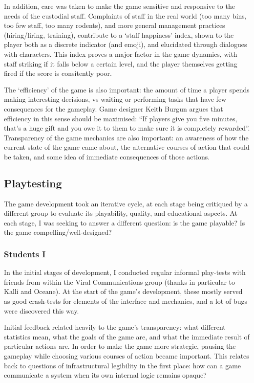 \documentclass[nofonts,nols,justified,nobib]{tufte-book}
\begin{document}
In addition, care was taken to make the game sensitive and responsive to the needs of the custodial staff. Complaints of staff in the real world (too many bins, too few staff, too many rodents), and more general management practices (hiring/firing, training), contribute to a `staff happiness' index, shown to the player both as a discrete indicator (and emoji), and elucidated through dialogues with characters. This index proves a major factor in the game dynamics, with staff striking if it falls below a certain level, and the player themselves getting fired if the score is consitently poor.

The `efficiency' of the game is also important: the amount of time a player spends making interesting decisions, vs waiting or performing tasks that have few consequences for the gameplay. Game designer Keith Burgun argues that efficiency in this sense should be maximised: ``If players give you five minutes, that's a huge gift and you owe it to them to make sure it is completely rewarded''. Transparency of the game mechanics are also important: an awareness of how the current state of the game came about, the alternative courses of action that could be taken, and some idea of immediate consequences of those actions. 

\subsection*{Playtesting}

The game development took an iterative cycle, at each stage being critiqued by a different group to evaluate its playability, quality, and educational aspects. At each stage, I was seeking to answer a different question: is the game playable? Is the game compelling/well-designed? 

\subsubsection*{Students I}

In the initial stages of development, I conducted regular informal play-tests with friends from within the Viral Communications group (thanks in particular to Kalli and Oceane). At the start of the game's development, these mostly served as good crash-tests for elements of the interface and mechanics, and a lot of bugs were discovered this way.

Initial feedback related heavily to the game's transparency: what different statistics mean, what the goals of the game are, and what the immediate result of particular actions are. In order to make the game more strategic, pausing the gameplay while choosing various courses of action became important. This relates back to questions of infrastructural legibility in the first place: how can a game communicate a system when its own internal logic remains opaque?
\end{document}
